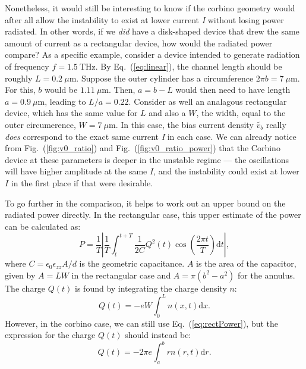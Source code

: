 \documentclass[12pt]{article}
\begin{document}
Nonetheless, it would still be interesting to know if the corbino geometry would after all allow the instability to exist at lower current \textit{I} without losing power radiated. In other words, if we \textit{did} have a disk-shaped device that drew the same amount of current as a rectangular device, how would the radiated power compare? As a specific example, consider a device intended to generate radiation of frequency $f=1.5\ \text{THz}$.  By Eq.~(\ref{eq:linear}), the channel length should be roughly $L = 0.2\ \mu\text{m}$.  Suppose the outer cylinder has a circumference $2 \pi b = 7\ \mu\text{m}$.  For this, $b$ would be $1.11 \ \mu\text{m}$.  Then, $a = b - L$ would then need to have length $a = 0.9\ \mu\text{m}$, leading to $L/a = 0.22$.  Consider as well an analagous rectangular device, which has the same value for $L$ and also a $W$, the width, equal to the outer circumerence, $W = 7\ \mu\text{m}$.  In this case, the bias current density $\tilde{v_b}$ really \textit{does} correspond to the exact same current \textit{I} in each case.  We can already notice from Fig.~(\ref{fig:v0_ratio}) and Fig.~(\ref{fig:v0_ratio_power}) that the Corbino device at these parameters is deeper in the unstable regime --- the oscillations will have higher amplitude at the same $I$, and the instability could exist at lower $I$ in the first place if that were desirable.

To go further in the comparison, it helps to work out an upper bound on the radiated power directly.  In the rectangular case, this upper estimate of the power can be calculated as:
\begin{equation}
\label{eq:rectPower}
P = \frac{1}{T}\left| \frac{1}{T}\int_t^{t+T} \frac{1}{2C}Q^2(t)\cos(\frac{2 \pi t}{T}) \mathrm{d}t\right|,
\end{equation}
where $C = \epsilon_0\epsilon_{zz}A / d$ is the geometric capacitance.  $A$ is the area of the capacitor, given by $A = LW$ in the rectangular case and $A=\pi(b^2-a^2)$ for the annulus.  The charge $Q(t)$ is found by integrating the charge density $n$:
\begin{equation}
\label{eq:rectCharge}
Q(t) = -eW  \int_0^Ln(x,t) \mathrm{d}x.
\end{equation}
However, in the corbino case, we can still use Eq.~(\ref{eq:rectPower}), but the expression for the charge $Q(t)$ should instead be:
\begin{equation}
\label{eq:rectCharge}
Q(t) = -2 \pi e\int_a^b r n(r,t)\mathrm{d}r.
\end{equation}
\end{document}
